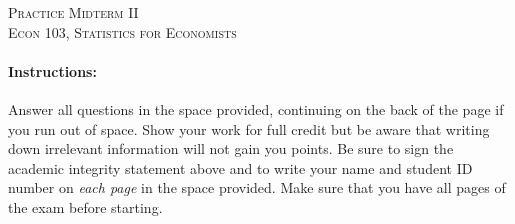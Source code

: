 \documentclass[addpoints,12pt]{exam}
\begin{document}
\begin{center}
\textsc{\Large Practice Midterm II\\\vspace{0.15in} \normalsize Econ 103, Statistics for Economists }%

\vspace{2em}



\end{center}


\vspace{2em}
\begin{center}
\end{center}
\vspace{0.2in}

\vspace{0.2in}

\noindent{}

\vspace{0.2in}

\noindent{}
\hfill
{}

\vspace{2em}


\vspace{2em}

\paragraph{Instructions:} Answer all questions in the space provided, continuing on the back of the page if you run out of space. Show your work for full credit but be aware that writing down irrelevant information will not gain you points. Be sure to sign the academic integrity statement above and to write your name and student ID number on \emph{each page} in the space provided. Make sure that you have all pages of the exam before starting.
\end{document}
